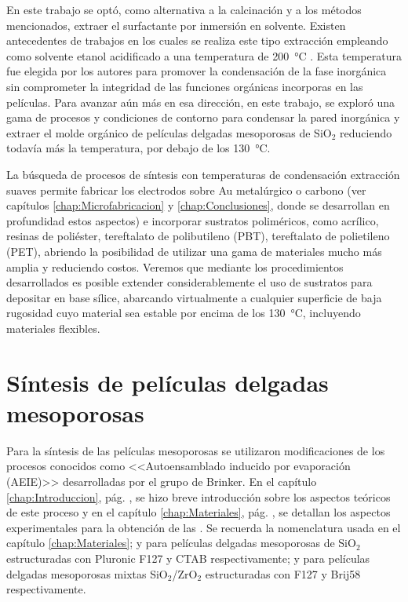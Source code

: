 	En este trabajo se optó, como alternativa a la calcinación y a los métodos mencionados, extraer el surfactante por inmersión en solvente. Existen antecedentes de trabajos en los cuales se realiza este tipo extracción empleando como solvente etanol acidificado a una temperatura de \SI{200}{\celsius} \cite{Angelome2008,Calvo20210,Calvo2010,Fuertes2009}. Esta temperatura fue elegida por los autores para promover la condensación de la fase inorgánica sin comprometer la integridad de las funciones orgánicas incorporas en las películas. Para avanzar aún más en esa dirección, en este trabajo, se exploró una gama de procesos y condiciones de contorno para condensar la pared inorgánica y extraer el molde orgánico de películas delgadas mesoporosas de SiO$_2$ reduciendo todavía más la temperatura, por debajo de los \SI{130}{\celsius}.

	La búsqueda de procesos de síntesis con temperaturas de condensación extracción suaves permite fabricar los electrodos sobre Au metalúrgico o carbono (ver capítulos \ref{chap:Microfabricacion} y \ref{chap:Conclusiones}, donde se desarrollan en profundidad estos aspectos) e incorporar sustratos poliméricos, como acrílico, resinas de poliéster, tereftalato de polibutileno (PBT), tereftalato de polietileno (PET), abriendo la posibilidad de utilizar una gama de materiales mucho más amplia y reduciendo costos. Veremos que mediante los procedimientos desarrollados es posible extender considerablemente el uso de sustratos para depositar \pdm\space en base sílice, abarcando virtualmente a cualquier superficie de baja rugosidad cuyo material sea estable por encima de los \SI{130}{\celsius}, incluyendo materiales flexibles.
	
\section{Síntesis de películas delgadas mesoporosas}
		
		Para la síntesis de las películas mesoporosas se utilizaron modificaciones de los procesos conocidos como <<Autoensamblado inducido por evaporación (AEIE)>> desarrolladas por el grupo de Brinker.\cite{Brinker1999} En el capítulo \ref{chap:Introduccion}, pág. \pageref{sec:mesoporosos}, se hizo breve introducción sobre los aspectos teóricos de este proceso y en el capítulo \ref{chap:Materiales}, pág. \pageref{sec:sintesis_mesoporosos}, se detallan los aspectos experimentales para la obtención de las \pdm. Se recuerda la nomenclatura usada en el capítulo \ref{chap:Materiales}; \pdmF\space y \pdmC\space para películas delgadas mesoporosas de SiO$_2$ estructuradas con Pluronic F127 y CTAB respectivamente; \pdmZ\space y \pdmZB\space para películas delgadas mesoporosas mixtas SiO$_2$/ZrO$_2$ estructuradas con F127 y Brij58 respectivamente.

